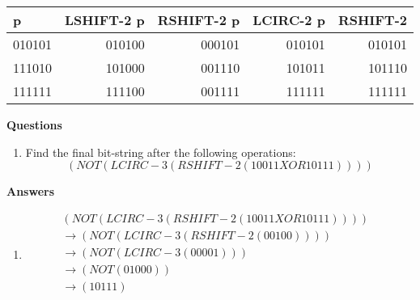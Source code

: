 \documentclass[12pt,letterpaper]{article}
\begin{document}
\begin{center}
  \begin{tabular}{ l || r | r | r | r}
    \hline
    p & \textbf{LSHIFT-2} p & \textbf{RSHIFT-2} p & \textbf{LCIRC-2} p & \textbf{RSHIFT-2} \\
    \hline \hline
    010101 & 010100 & 000101 & 010101 & 010101 \\
    111010 & 101000 & 001110 & 101011 & 101110 \\
    111111 & 111100 & 001111 & 111111 & 111111 \\
    \hline
  \end{tabular}
\end{center}

\bigskip
\noindent \textbf{Questions}
\begin{enumerate}
\item Find the final bit-string after the following operations:
  \[
  (NOT (LCIRC-3 (RSHIFT-2 (10011 XOR 10111))))
  \]

\end{enumerate}

\pagebreak
\noindent \textbf{Answers}

\begin{enumerate}

\item \begin{align*}
  (NOT (LCIRC-3 (RSHIFT-2 (10011 XOR 10111)))) & \\
  \rightarrow (NOT (LCIRC-3 (RSHIFT-2 (00100)))) &  \\
  \rightarrow (NOT (LCIRC-3 (00001))) &  \\
  \rightarrow (NOT (01000)) & \\
  \rightarrow (10111) & \\
\end{align*}

\end{enumerate}
\end{document}
